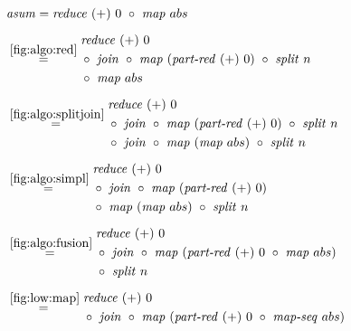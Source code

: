 \begin{figure*}[t]
\begin{align*}
  &\text{\textit{asum}} = \reduce\ (+)\ 0\ \circ\ \map\ abs\\[.5em]
  &\begin{aligned}
  & \overset{\ref{fig:algo:red}}{\hspace{.2em}=\hspace{.2em}}
      \begin{aligned}
        & \reduce\ (+)\ 0\\
        &\circ\ \join\ \circ\ \map\ (\partRed\ (+)\ 0)\ \circ\ \splitN\ n\\
        &\circ\ \map\ abs
      \end{aligned}\\[.5em]
  & \overset{\ref{fig:algo:splitjoin}}{=\hspace{.2em}}
      \begin{aligned}
        & \reduce\ (+)\ 0\\
        &\circ\ \join\ \circ\ \map\ (\partRed\ (+)\ 0)\ \circ\ \splitN\ n\\
        &\circ\ \join\ \circ\ \map\ (\map\ abs)\ \circ\ \splitN\ n
      \end{aligned}\\[.5em]
  & \overset{\ref{fig:algo:simpl}}{=\hspace{.2em}}
      \begin{aligned}
        & \reduce\ (+)\ 0\\
        &\circ\ \join\ \circ\ \map\ (\partRed\ (+)\ 0)\\
        &\circ\ \map\ (\map\ abs)\ \circ\ \splitN\ n
      \end{aligned}\\[.5em]
  & \overset{\ref{fig:algo:fusion}}{=\hspace{.2em}}
      \begin{aligned}
        & \reduce\ (+)\ 0\\
        &\circ\ \join\ \circ\ \map\ (\partRed\ (+)\ 0\ \circ\ \map\ abs)\\
        &\circ\ \splitN\ n
      \end{aligned}\\[.5em]
  & \overset{\ref{fig:low:map}}{=\hspace{.2em}}
      \begin{aligned}
        & \reduce\ (+)\ 0\\
        &\circ\ \join\ \circ\ \map\ (\partRed\ (+)\ 0\ \circ\ \mapSeq\ abs)\\

\end{aligned}
\end{aligned}
\end{align*}
\end{figure*}

